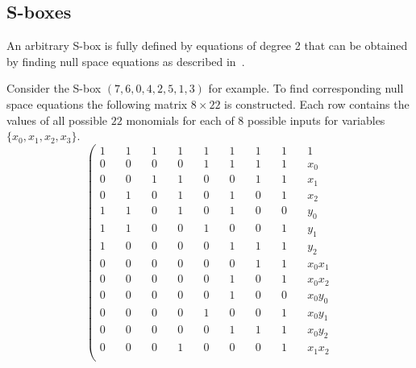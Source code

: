 \subsection{S-boxes}

An arbitrary S-box is fully defined by equations of degree 2 that can be
obtained by finding null space equations as described in~\cite{kleiman:xsl}.

Consider the S-box $(7, 6, 0, 4, 2, 5, 1, 3)$ for example. To find 
corresponding null space equations the following matrix $8 \times 22$ is
constructed.  Each row contains the values of all possible $22$ monomials for
each of $8$ possible inputs for variables $\{x_0, x_1, x_2, x_3\}$.
\begin{equation}
    \label{eqn:sbox-matr}
    \left(
    \begin{array}{lllllllll}
        1 &\quad 1 &\quad 1 &\quad 1 &\quad 1 &\quad 1 &\quad 1 &\quad 1 &\quad 1       \\[-1ex]
        0 &\quad 0 &\quad 0 &\quad 0 &\quad 1 &\quad 1 &\quad 1 &\quad 1 &\quad x_0     \\[-1ex]
        0 &\quad 0 &\quad 1 &\quad 1 &\quad 0 &\quad 0 &\quad 1 &\quad 1 &\quad x_1     \\[-1ex]
        0 &\quad 1 &\quad 0 &\quad 1 &\quad 0 &\quad 1 &\quad 0 &\quad 1 &\quad x_2     \\[-1ex]
        1 &\quad 1 &\quad 0 &\quad 1 &\quad 0 &\quad 1 &\quad 0 &\quad 0 &\quad y_0     \\[-1ex]
        1 &\quad 1 &\quad 0 &\quad 0 &\quad 1 &\quad 0 &\quad 0 &\quad 1 &\quad y_1     \\[-1ex]
        1 &\quad 0 &\quad 0 &\quad 0 &\quad 0 &\quad 1 &\quad 1 &\quad 1 &\quad y_2     \\[-1ex]
        0 &\quad 0 &\quad 0 &\quad 0 &\quad 0 &\quad 0 &\quad 1 &\quad 1 &\quad x_0 x_1 \\[-1ex]
        0 &\quad 0 &\quad 0 &\quad 0 &\quad 0 &\quad 1 &\quad 0 &\quad 1 &\quad x_0 x_2 \\[-1ex]
        0 &\quad 0 &\quad 0 &\quad 0 &\quad 0 &\quad 1 &\quad 0 &\quad 0 &\quad x_0 y_0 \\[-1ex]
        0 &\quad 0 &\quad 0 &\quad 0 &\quad 1 &\quad 0 &\quad 0 &\quad 1 &\quad x_0 y_1 \\[-1ex]
        0 &\quad 0 &\quad 0 &\quad 0 &\quad 0 &\quad 1 &\quad 1 &\quad 1 &\quad x_0 y_2 \\[-1ex]
        0 &\quad 0 &\quad 0 &\quad 1 &\quad 0 &\quad 0 &\quad 0 &\quad 1 &\quad x_1 x_2 \\[-1ex]

\end{array}
\end{equation}
